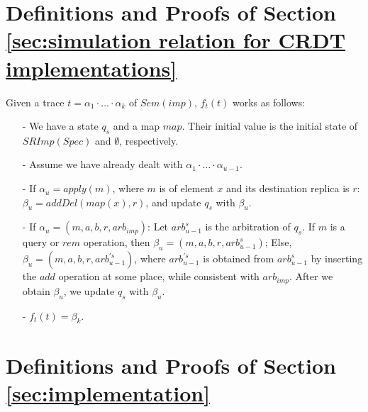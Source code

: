 \section{Definitions and Proofs of Section \ref{sec:simulation relation for CRDT implementations}}
\label{sec:appendix definitions and proofs of section simulation relation for CRDT implementations}


Given a trace $t = \alpha_1 \cdot \ldots \cdot \alpha_k$ of $Sem(imp)$, $f_t(t)$ works as follows:

\begin{itemize}
\setlength{\itemsep}{0.5pt}
\item[-] We have a state $q_s$ and a map $\mathit{map}$. Their initial value is the initial state of $SRImp(Spec)$ and $\emptyset$, respectively.

\item[-] Assume we have already dealt with $\alpha_1 \cdot \ldots \cdot \alpha_{u-1}$.

\item[-] If $\alpha_u = apply(m)$, where $m$ is of element $x$ and its destination replica is $r$: $\beta_u = addDel(map(x),r)$, and update $q_s$ with $\beta_u$.

\item[-] If $\alpha_u = (m,a,b,r,\mathit{arb}_{\mathit{imp}})$: Let $\mathit{arb}_{u-1}^s$ is the arbitration of $q_s$. If $m$ is a query or $\mathit{rem}$ operation, then $\beta_u = (m,a,b,r,\mathit{arb}_{u-1}^s)$; Else, $\beta_u = (m,a,b,r,\mathit{arb}_{u-1}^{'s})$, where $\mathit{arb}_{u-1}^{'s}$ is obtained from $\mathit{arb}_{u-1}^s$ by inserting the $add$ operation at some place, while consistent with $\mathit{arb}_{\mathit{imp}}$. After we obtain $\beta_u$, we update $q_s$ with $\beta_u$.

\item[-] $f_t(t) = \beta_k$.
\end{itemize}
























\section{Definitions and Proofs of Section \ref{sec:implementation}}
\label{sec:appendix definitions and proofs of section implementation}



